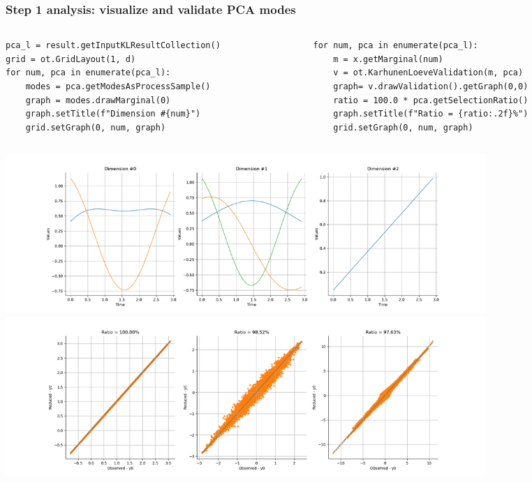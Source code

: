 \documentclass{beamer}
\begin{document}
\begin{frame}[containsverbatim]
\frametitle{Step 1 analysis: visualize and validate PCA modes}
\vspace{-0.3cm}
\begin{columns}
  \begin{column}{0.49\textwidth}
  \begin{lstlisting}
pca_l = result.getInputKLResultCollection()
grid = ot.GridLayout(1, d)
for num, pca in enumerate(pca_l):
    modes = pca.getModesAsProcessSample()
    graph = modes.drawMarginal(0)
    graph.setTitle(f"Dimension #{num}")
    grid.setGraph(0, num, graph)
  \end{lstlisting}    
  \end{column}
  \begin{column}{0.49\textwidth}
    \begin{lstlisting}
for num, pca in enumerate(pca_l):
    m = x.getMarginal(num)
    v = ot.KarhunenLoeveValidation(m, pca)
    graph= v.drawValidation().getGraph(0,0)
    ratio = 100.0 * pca.getSelectionRatio()
    graph.setTitle(f"Ratio = {ratio:.2f}%")
    grid.setGraph(0, num, graph)
    \end{lstlisting}    
    \end{column}  
\end{columns}

\vspace{-0.4cm}
\centering
\includegraphics[width=0.8\textwidth]{figures/pca_modes.pdf}
\includegraphics[width=0.8\textwidth]{figures/pca_validation.png}

\end{frame}
  
  
  
  
\end{document}
